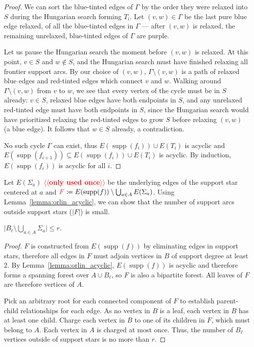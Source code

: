 \documentclass[a4paper,UKenglish]{socg-lipics-v2018}
\makeatletter
\def\note#1{\textcolor{red}{{#1}}}
\def\abs#1{\mathopen| #1 \mathclose|}		%
\def\supp{\operatorname{supp}}
\theoremstyle{plain}
\numberwithin{figure}{section}
\def\EMPH#1{\textcolor{BrickRed}{{\emph{#1}}}}
\def\n@te#1{\textsf{\boldmath \textbf{$\langle\!\langle$#1$\rangle\!\rangle$}}\leavevmode}
\def\note#1{\textcolor{red}{\n@te{#1}}}
\makeatother
\begin{document}
\begin{toappendix}
\begin{proof}
We can sort the blue-tinted edges of $\Gamma$ by the order they were relaxed
into $S$ during the Hungarian search forming $T_i$.
Let $(v, w) \in \Gamma$ be the last pure blue edge relaxed, of all the
blue-tinted edges in $\Gamma$ --- after $(v, w)$ is relaxed, the remaining
unrelaxed, blue-tinted edges of $\Gamma$ are purple.

Let us pause the Hungarian search the moment before $(v, w)$ is relaxed.
At this point, $v \in S$ and $w \not\in S$, and the Hungarian search must have
finished relaxing all frontier support arcs.
By our choice of $(v, w)$, $\Gamma \setminus (v, w)$ is a path of relaxed blue
edges and red-tinted edges which connect $v$ and $w$.
Walking around $\Gamma \setminus (v, w)$ from $v$ to $w$, we see that every
vertex of the cycle must be in $S$ already: $v \in S$, relaxed blue edges have
both endpoints in $S$, and any unrelaxed red-tinted edge must have both
endpoints in $S$, since the Hungarian search would have prioritized relaxing
the red-tinted edges to grow $S$ before relaxing $(v, w)$ (a blue edge).
It follows that $w \in S$ already, a contradiction.

No such cycle $\Gamma$ can exist, thus $E(\supp(f_i)) \cup E(T_i)$ is acyclic
and $E(\supp(f_{i+1})) \subseteq E(\supp(f_i)) \cup E(T_i)$ is acyclic.
By induction, $E(\supp(f_i))$ is acyclic for all $i$.
\end{proof}

Let \EMPH{$E(\Sigma_a)$} \note{only used once} be the underlying edges of the support star centered
at $a$ and $\EMPH{$F$} \coloneqq E(\supp(f)) \setminus \bigcup_{a \in A} E(\Sigma_a)$.
Using Lemma~\ref{lemma:orlin_acyclic}, we can show that the number of support
arcs outside support stars ($\abs{F}$) is small.

\begin{lemmarep}
\label{lemma:no_star_support_size}
$\abs{B_\ell \setminus \bigcup_{a \in A} \Sigma_a} \leq r$.
\end{lemmarep}

\begin{proof}
$F$ is constructed from $E(\supp(f))$ by eliminating edges in support stars,
therefore all edges in $F$ must adjoin vertices in $B$ of support degree at
least 2.
By Lemma~\ref{lemma:orlin_acyclic}, $E(\supp(f))$ is acyclic and therefore forms
a spanning forest over $A \cup B_\ell$, so $F$ is also a bipartite forest.
All leaves of $F$ are therefore vertices of $A$.

Pick an arbitrary root for each connected component of $F$ to establish
parent-child relationships for each edge.
As no vertex in $B$ is a leaf, each vertex in $B$ has at least one child.
Charge each vertex in $B$ to one of its children in $F$, which must belong to $A$.
Each vertex in $A$ is charged at most once.
Thus, the number of $B_\ell$ vertices outside of support stars is no more than $r$.
\end{proof}

\end{toappendix}
\end{document}

